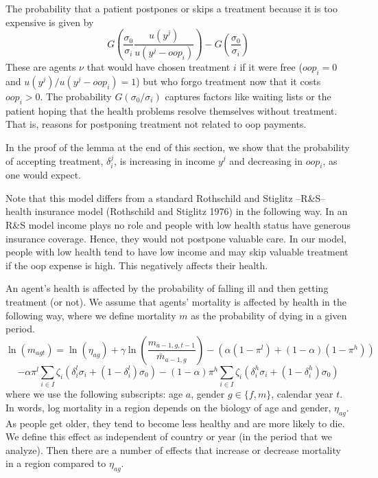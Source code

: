 \documentclass[a4paper,12pt]{article}
\makeatletter
\newcommand{\citeprocitem}[2]{\hyper@linkstart{cite}{citeproc_bib_item_#1}#2\hyper@linkend}
\makeatother
\begin{document}
The probability that a patient postpones or skips a treatment because it is too expensive is given by
\begin{equation}
\label{eq:3}
G\left( \frac{\sigma_0}{\sigma_i} \frac{u(y^{j})}{u(y^{j}-oop_{i})} \right) - G\left( \frac{\sigma_0}{\sigma_i} \right)
\end{equation}
These are agents \(\nu\) that would have chosen treatment \(i\) if it were free (\(oop_{i}=0\) and \(u(y^j)/u(y^j-oop_i)=1\)) but who forgo treatment now that it costs \(oop_{i}>0\). The probability \(G(\sigma_{0}/\sigma_{i})\) captures factors like waiting lists or the patient hoping that the health problems resolve themselves without treatment. That is, reasons for postponing treatment not related to oop payments.

In the proof of the lemma at the end of this section, we show that the probability of accepting treatment, \(\delta_i^j\), is increasing in income \(y^j\) and decreasing in \(oop_{i}\), as one would expect.

Note that this model differs from a standard Rothschild and Stiglitz --R\&S-- health insurance model (\citeprocitem{24}{Rothschild and Stiglitz 1976}) in the following way. In an R\&S model income plays no role and people with low health status have generous insurance coverage. Hence, they would not postpone valuable care. In our model, people with low health tend to have low income and may skip valuable treatment if the oop expense is high. This negatively affects their health.

An agent's health is affected by the probability of falling ill and then getting treatment (or not). We assume that agents' mortality is affected by health in the following way, where we define mortality \(m\) as the probability of dying in a given period.
\begin{equation}
\label{eq:health}
\ln(m_{agt}) = \ln({\eta}_{ag}) + \gamma \ln \left( \frac{m_{a-1,g,t-1}}{\bar m_{a-1,g}}\right) - (\alpha (1-\pi^l) + (1-\alpha) (1-\pi^{h})) \end{equation}
\begin{equation*}
 - \alpha \pi^l \sum_{i \in I} \zeta_i (\delta_i^l \sigma_i + (1-\delta_i^l)\sigma_0) - (1-\alpha) \pi^h \sum_{i \in I} \zeta_i (\delta_i^h \sigma_i + (1-\delta_i^h) \sigma_0)
\end{equation*}
where we use the following subscripts: age \(a\), gender \(g \in \{f,m\}\), calendar year \(t\). In words, log mortality in a region depends on the biology of age and gender, \(\eta_{ag}\). As people get older, they tend to become less healthy and are more likely to die. We define this effect as independent of country or year (in the period that we analyze). Then there are a number of effects that increase or decrease mortality in a region compared to \(\eta_{ag}\).
\end{document}
